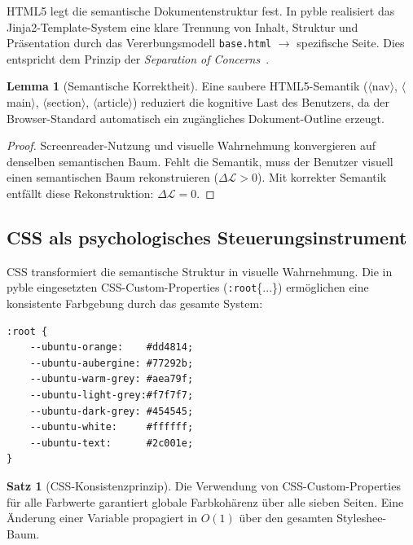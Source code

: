 ﻿\documentclass[a4paper,12pt]{article}
\theoremstyle{definition}
\newtheorem{satz}{Satz}
\newtheorem{lemma}{Lemma}
\begin{document}
HTML5 legt die semantische Dokumentenstruktur fest. In pyble realisiert
das Jinja2-Template-System eine klare Trennung von Inhalt, Struktur und
Präsentation durch das Vererbungsmodell \texttt{base.html} $\to$ spezifische
Seite. Dies entspricht dem Prinzip der \emph{Separation of Concerns}~\cite{dijkstra1982}.

\begin{lemma}[Semantische Korrektheit]
\label{lem:html}
    Eine saubere HTML5-Semantik ($\langle$nav$\rangle$, $\langle$main$\rangle$,
    $\langle$section$\rangle$, $\langle$article$\rangle$) reduziert die
    kognitive Last des Benutzers, da der Browser-Standard automatisch
    ein zugängliches Dokument-Outline erzeugt.
\end{lemma}

\begin{proof}
    Screenreader-Nutzung und visuelle Wahrnehmung konvergieren auf
    denselben semantischen Baum. Fehlt die Semantik, muss der Benutzer
    visuell einen semantischen Baum rekonstruieren ($\Delta\mathcal{L} > 0$).
    Mit korrekter Semantik entfällt diese Rekonstruktion: $\Delta\mathcal{L} = 0$.
\end{proof}

\subsection{CSS als psychologisches Steuerungsinstrument}

CSS transformiert die semantische Struktur in visuelle Wahrnehmung.
Die in pyble eingesetzten CSS-Custom-Properties (\texttt{:root}\{...\})
ermöglichen eine konsistente Farbgebung durch das gesamte System:

\begin{lstlisting}[caption={CSS Custom Properties in pyble (base.css)}]
:root {
    --ubuntu-orange:    #dd4814;
    --ubuntu-aubergine: #77292b;
    --ubuntu-warm-grey: #aea79f;
    --ubuntu-light-grey:#f7f7f7;
    --ubuntu-dark-grey: #454545;
    --ubuntu-white:     #ffffff;
    --ubuntu-text:      #2c001e;
}
\end{lstlisting}

\begin{satz}[CSS-Konsistenzprinzip]
\label{satz:css}
    Die Verwendung von CSS-Custom-Properties für alle Farbwerte garantiert
    globale Farbkohärenz über alle sieben Seiten. Eine Änderung einer Variable
    propagiert in $O(1)$ über den gesamten Styleshee-Baum.
\end{satz}
\end{document}
